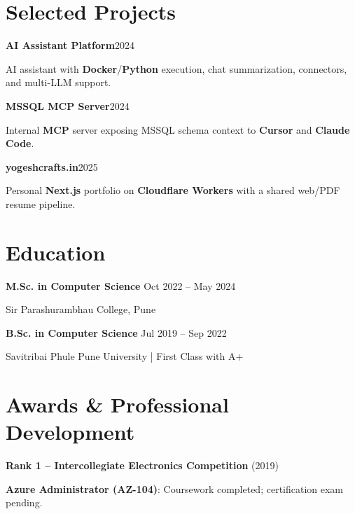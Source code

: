 \documentclass[10pt,letterpaper]{article}
\begin{document}
\section{Selected Projects}
\noindent\textbf{AI Assistant Platform}\hfill {\small\color{muted}2024}\par
AI assistant with \textbf{Docker}/\textbf{Python} execution, chat summarization, connectors, and multi-LLM support.\par\vspace{4pt}
\noindent\textbf{MSSQL MCP Server}\hfill {\small\color{muted}2024}\par
Internal \textbf{MCP} server exposing MSSQL schema context to \textbf{Cursor} and \textbf{Claude Code}.\par\vspace{4pt}
\noindent\textbf{yogeshcrafts.in}\hfill {\small\color{muted}2025}\par
Personal \textbf{Next.js} portfolio on \textbf{Cloudflare Workers} with a shared web/PDF resume pipeline.\par\vspace{4pt}
\section{Education}
\textbf{M.Sc. in Computer Science} \hfill {\small\color{muted}Oct 2022 -- May 2024}\par
{\small\color{muted}Sir Parashurambhau College, Pune}\par\vspace{3pt}
\textbf{B.Sc. in Computer Science} \hfill {\small\color{muted}Jul 2019 -- Sep 2022}\par
{\small\color{muted}Savitribai Phule Pune University | First Class with A+}\par\vspace{3pt}
\section{Awards \& Professional Development}
\textbf{Rank 1 -- Intercollegiate Electronics Competition} (2019)\par
\textbf{Azure Administrator (AZ-104)}: Coursework completed; certification exam pending.\par
\end{document}
